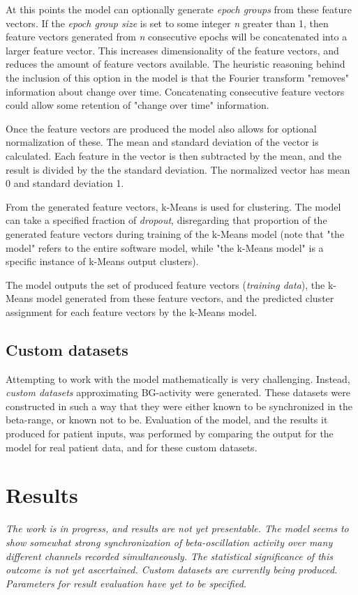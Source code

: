 \documentclass{article}
\begin{document}
At this points the model can optionally generate \textit{epoch groups} from these feature vectors. If the \textit{epoch group size} is set to some integer \textit{n} greater than 1, then feature vectors generated from \textit{n} consecutive epochs will be concatenated into a larger feature vector. This increases dimensionality of the feature vectors, and reduces the amount of feature vectors available. The heuristic reasoning behind the inclusion of this option in the model is that the Fourier transform "removes" information about change over time. Concatenating consecutive feature vectors could allow some retention of "change over time" information.

Once the feature vectors are produced the model also allows for optional normalization of these. The mean and standard deviation of the vector is calculated. Each feature in the vector is then subtracted by the mean, and the result is divided by the the standard deviation. The normalized vector has mean 0 and standard deviation 1.

From the generated feature vectors, k-Means is used for clustering. The model can take a specified fraction of \textit{dropout}, disregarding that proportion of the generated feature vectors during training of the k-Means model (note that "the model" refers to the entire software model, while "the k-Means model" is a specific instance of k-Means output clusters).

The model outputs the set of produced feature vectors (\textit{training data}), the k-Means model generated from these feature vectors, and the predicted cluster assignment for each feature vectors by the k-Means model.

\subsection{Custom datasets}
Attempting to work with the model mathematically is very challenging. Instead, \textit{custom datasets} approximating BG-activity were generated. These datasets were constructed in such a way that they were either known to be synchronized in the beta-range, or known not to be. Evaluation of the model, and the results it produced for patient inputs, was performed by comparing the output for the model for real patient data, and for these custom datasets. 

\newpage
\section{Results}
\textit{The work is in progress, and results are not yet presentable. The model seems to show somewhat strong synchronization of beta-oscillation activity over many different channels recorded simultaneously. The statistical significance of this outcome is not yet ascertained. Custom datasets are currently being produced. Parameters for result evaluation have yet to be specified.}
\end{document}
